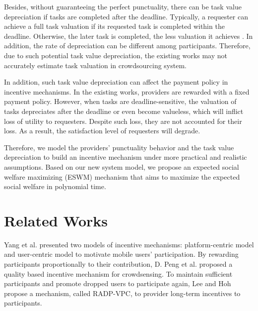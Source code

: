 \documentclass[letterpaper]{article} %
\begin{document}
	Besides, without guaranteeing the perfect punctuality, there can be task value depreciation if tasks are completed after the deadline. Typically, a requester can achieve a full task valuation if its requested task is completed within the deadline. Otherwise, the later task is completed, the less valuation it achieves \cite{depreciation}. In addition, the rate of depreciation can be different among participants. Therefore, due to such potential task value depreciation, the existing works may not accurately estimate task valuation in crowdsourcing system.
	 
	In addition, such task value depreciation can affect the payment policy in incentive mechanisms. In the existing works, providers are rewarded with a fixed payment policy. However, when tasks are deadline-sensitive, the valuation of tasks depreciates after the deadline or even become valueless, which will inflict loss of utility to requesters. Despite such loss, they are not accounted for their loss. As a result, the satisfaction level of requesters will degrade. 
	
	Therefore, we model the providers' punctuality behavior and the task value depreciation to build an incentive mechanism under more practical and realistic assumptions. Based on our new system model, we propose an expected social welfare maximizing (ESWM) mechanism that aims to maximize the expected social welfare in polynomial time.
	
	\section{Related Works}
	Yang et al. \cite{Yang} presented two models of incentive mechanisms: platform-centric model and user-centric model to motivate mobile users' participation. By rewarding participants proportionally to their contribution, D. Peng et al. \cite{quality} proposed a quality based incentive mechanism for crowdsensing. To maintain sufficient participants and promote dropped users to participate again, Lee and Hoh \cite{Lee} propose a mechanism, called RADP-VPC, to provider long-term incentives to participants. 
	
\end{document}
